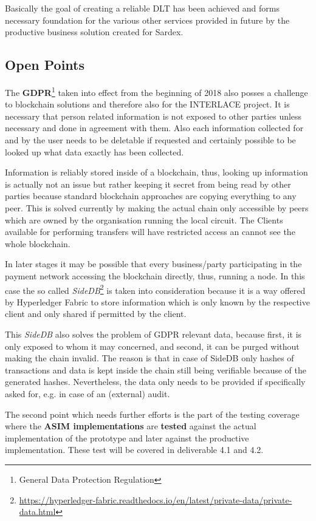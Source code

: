 Basically the goal of creating a reliable DLT has been achieved and forms necessary foundation for the various other services provided in future by the productive business solution created for Sardex.

\subsection{Open Points}

The \textbf{GDPR}\footnote{General Data Protection Regulation\cite{GDPR}} taken into effect from the beginning of 2018 also posses a challenge to blockchain solutions and therefore also for the INTERLACE project. It is necessary that person related information is not exposed to other parties unless necessary and done in agreement with them. Also each information collected for and by the user needs to be deletable if requested and certainly possible to be looked up what data exactly has been collected.

Information is reliably stored inside of a blockchain, thus, looking up information is actually not an issue but rather keeping it secret from being read by other parties because standard blockchain approaches are copying everything to any peer. This is solved currently by making the actual chain only accessible by peers which are owned by the organisation running the local circuit. The Clients available for performing transfers will have restricted access an cannot see the whole blockchain.

In later stages it may be possible that every business/party participating in the payment network accessing the blockchain directly, thus, running a node. In this case the so called \textit{SideDB}\footnote{\url{https://hyperledger-fabric.readthedocs.io/en/latest/private-data/private-data.html}} is taken into consideration because it is a way offered by Hyperledger Fabric to store information which is only known by the respective client and only shared if permitted by the client.

This \textit{SideDB} also solves the problem of GDPR relevant data, because first, it is only exposed to whom it may concerned, and second, it can be purged without making the chain invalid. The reason is that in case of SideDB only hashes of transactions and data is kept inside the chain still being verifiable because of the generated hashes. Nevertheless, the data only needs to be provided if specifically asked for, e.g. in case of an (external) audit.

The second point which needs further efforts is the part of the testing coverage where the \textbf{ASIM implementations} are \textbf{tested} against the actual implementation of the prototype and later against the productive implementation. These test will be covered in deliverable 4.1 and 4.2.